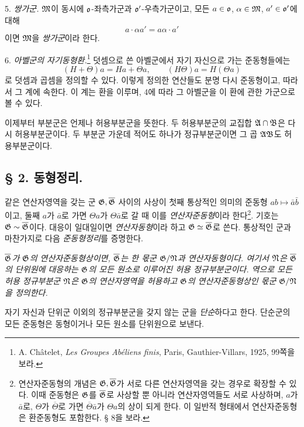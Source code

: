 5. \emph{쌍가군.} \(\mathfrak M\)이 동시에 \(\mathfrak o\)-좌측가군과 \(\mathfrak o'\)-우측가군이고, 모든 \(a\in\mathfrak o\), \(\alpha\in\mathfrak M\), \(a'\in\mathfrak o'\)에 대해
\[
        a\cdot\alpha a'=a\alpha\cdot a'
\]
이면 \(\mathfrak M\)을 \emph{쌍가군}이라 한다.

6. \emph{아벨군의 자기동형환.}\footnote{A. Châtelet, \emph{Les Groupes Abéliens finis}, Paris, Gauthier-Villars, 1925, 99쪽을 보라.} 덧셈으로 쓴 아벨군에서 자기 자신으로 가는 준동형들에는
\[
        (H+\Theta)a=Ha+\Theta a,\qquad
        (H\Theta)a=H(\Theta a)
\]
로 덧셈과 곱셈을 정의할 수 있다. 이렇게 정의한 연산들도 분명 다시 준동형이고, 따라서 그 계에 속한다. 이 계는 환을 이루며, 4에 따라 그 아벨군을 이 환에 관한 가군으로 볼 수 있다.

이제부터 \glqq{}부분군\grqq{}은 언제나 허용부분군을 뜻한다. 두 허용부분군의 교집합 \(\mathfrak A\cap\mathfrak B\)은 다시 허용부분군이다. 두 부분군 가운데 적어도 하나가 정규부분군이면 그 곱 \(\mathfrak A\mathfrak B\)도 허용부분군이다.

\subsection*{§ 2. 동형정리.}

같은 연산자영역을 갖는 군 \(\mathfrak G,\overline{\mathfrak G}\) 사이의 사상이 첫째 통상적인 의미의 준동형 \(ab\mapsto\bar a\bar b\)이고, 둘째 \(a\)가 \(\bar a\)로 가면 \(\Theta a\)가 \(\Theta\bar a\)로 갈 때 이를 \emph{연산자준동형}이라 한다\footnote{연산자준동형의 개념은 \(\mathfrak G,\overline{\mathfrak G}\)가 서로 다른 연산자영역을 갖는 경우로 확장할 수 있다. 이때 준동형은 \(\mathfrak G\)를 \(\overline{\mathfrak G}\)로 사상할 뿐 아니라 연산자영역들도 서로 사상하며, \(a\)가 \(\bar a\)로, \(\Theta\)가 \(\overline\Theta\)로 가면 \(\overline\Theta\bar a\)가 \(\Theta a\)의 상이 되게 한다. 이 일반적 형태에서 연산자준동형은 환준동형도 포함한다. § 8을 보라.}. 기호는 \(\mathfrak G\sim\overline{\mathfrak G}\)이다. 대응이 일대일이면 \emph{연산자동형}이라 하고 \(\mathfrak G\simeq\overline{\mathfrak G}\)로 쓴다. 통상적인 군과 마찬가지로 다음 \emph{준동형정리}를 증명한다.

\emph{\(\overline{\mathfrak G}\)가 \(\mathfrak G\)의 연산자준동형상이면, \(\overline{\mathfrak G}\)는 한 몫군 \(\mathfrak G/\mathfrak N\)과 연산자동형이다. 여기서 \(\mathfrak N\)은 \(\overline{\mathfrak G}\)의 단위원에 대응하는 \(\mathfrak G\)의 모든 원소로 이루어진 허용 정규부분군이다. 역으로 모든 허용 정규부분군 \(\mathfrak N\)은 \(\mathfrak G\)의 연산자영역을 허용하고 \(\mathfrak G\)의 연산자준동형상인 몫군 \(\mathfrak G/\mathfrak N\)을 정의한다.}

자기 자신과 단위군 이외의 정규부분군을 갖지 않는 군을 \emph{단순}하다고 한다. 단순군의 모든 준동형은 동형이거나 모든 원소를 단위원으로 보낸다.

